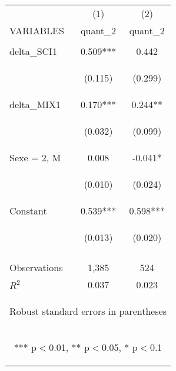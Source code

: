 \begin{center}
\begin{tabular}{lcc} \hline
 & (1) & (2) \\
VARIABLES & quant\_2 & quant\_2 \\ \hline
\vspace{4pt} & \begin{footnotesize}\end{footnotesize} & \begin{footnotesize}\end{footnotesize} \\
delta\_SCI1 & 0.509*** & 0.442 \\
\vspace{4pt} & \begin{footnotesize}(0.115)\end{footnotesize} & \begin{footnotesize}(0.299)\end{footnotesize} \\
delta\_MIX1 & 0.170*** & 0.244** \\
\vspace{4pt} & \begin{footnotesize}(0.032)\end{footnotesize} & \begin{footnotesize}(0.099)\end{footnotesize} \\
Sexe = 2, M & 0.008 & -0.041* \\
\vspace{4pt} & \begin{footnotesize}(0.010)\end{footnotesize} & \begin{footnotesize}(0.024)\end{footnotesize} \\
Constant & 0.539*** & 0.598*** \\
 & \begin{footnotesize}(0.013)\end{footnotesize} & \begin{footnotesize}(0.020)\end{footnotesize} \\
\vspace{4pt} & \begin{footnotesize}\end{footnotesize} & \begin{footnotesize}\end{footnotesize} \\
Observations & 1,385 & 524 \\
 $R^2$ & 0.037 & 0.023 \\ \hline
\multicolumn{3}{c}{\begin{footnotesize} Robust standard errors in parentheses\end{footnotesize}} \\
\multicolumn{3}{c}{\begin{footnotesize} *** p$<$0.01, ** p$<$0.05, * p$<$0.1\end{footnotesize}} \\
\end{tabular}
\end{center}
